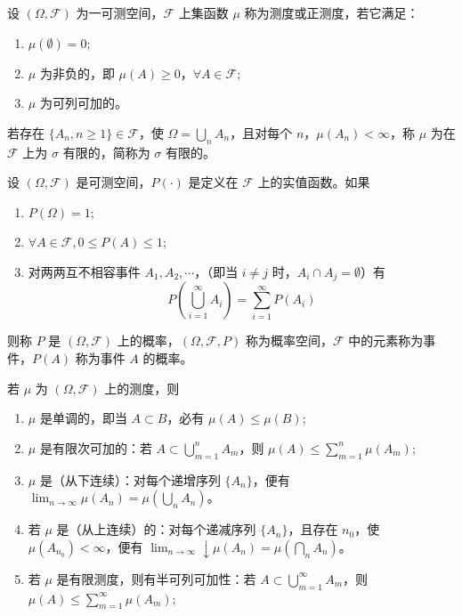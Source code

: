 \documentclass[lang=cn,10pt,thmcnt=section]{elegantbook}
\begin{document}
\begin{definition}
	设 \((\Omega, \mathscr{F})\) 为一可测空间，\(\mathscr{F}\) 上集函数 \(\mu\) 称为测度或正测度，若它满足：
\begin{enumerate}
    \item \(\mu(\emptyset) = 0\);
    \item \(\mu\) 为非负的，即 \(\mu(A) \geq 0\)，\(\forall A \in \mathscr{F}\);
    \item \(\mu\) 为可列可加的。
\end{enumerate}

若存在 \(\{A_n, n \geq 1\} \in \mathscr{F}\)，使 \(\Omega = \bigcup_n A_n\)，且对每个 \(n\)，\(\mu(A_n) < \infty\)，称 \(\mu\) 为在 \(\mathscr{F}\) 上为 \(\sigma\) 有限的，简称为 \(\sigma\) 有限的。

\end{definition}
\begin{definition}
	设 \((\Omega, \mathscr{F})\) 是可测空间，\(P(\cdot)\) 是定义在 \(\mathscr{F}\) 上的实值函数。如果
	\begin{enumerate}
		\item \(P(\Omega) = 1\);
		\item \(\forall A \in \mathscr{F}, 0 \leq P(A) \leq 1\);
		\item 对两两互不相容事件 \(A_1, A_2, \cdots\)，（即当 \(i \neq j\) 时，\(A_i \cap A_j = \emptyset\)）有
		\[
		P\left(\bigcup_{i=1}^{\infty} A_i\right) = \sum_{i=1}^{\infty} P(A_i)
		\]
	\end{enumerate}
	则称 \(P\) 是 \((\Omega, \mathscr{F})\) 上的概率，\((\Omega, \mathscr{F}, P)\) 称为概率空间，\(\mathscr{F}\) 中的元素称为事件，\(P(A)\) 称为事件 \(A\) 的概率。

\end{definition}
\begin{theorem}
	若 \(\mu\) 为 \((\Omega, \mathscr{F})\) 上的测度，则
\begin{enumerate}
    \item \(\mu\) 是单调的，即当 \(A \subset B\)，必有 \(\mu(A) \leq \mu(B)\);
    \item \(\mu\) 是有限次可加的：若 \(A \subset \bigcup_{m=1}^{n} A_m\)，则 \(\mu(A) \leq \sum_{m=1}^{n} \mu(A_m)\);
    \item \(\mu\) 是（从下连续）：对每个递增序列 \(\{A_n\}\)，便有 \(\lim_{n \to \infty} \mu(A_n) = \mu\left(\bigcup_{n} A_n\right)\)。
    \item 若 \(\mu\) 是（从上连续）的：对每个递减序列 \(\{A_n\}\)，且存在 \(n_0\)，使 \(\mu(A_{n_0}) < \infty\)，便有 \(\lim_{n \to \infty} \downarrow \mu(A_n) = \mu\left(\bigcap_{n} A_n\right)\)。
    \item 若 \(\mu\) 是有限测度，则有半可列可加性：若 \(A \subset \bigcup_{m=1}^{\infty} A_m\)，则 \(\mu(A) \leq \sum_{m=1}^{\infty} \mu(A_m)\);
\end{enumerate}
\end{theorem}
\end{document}
